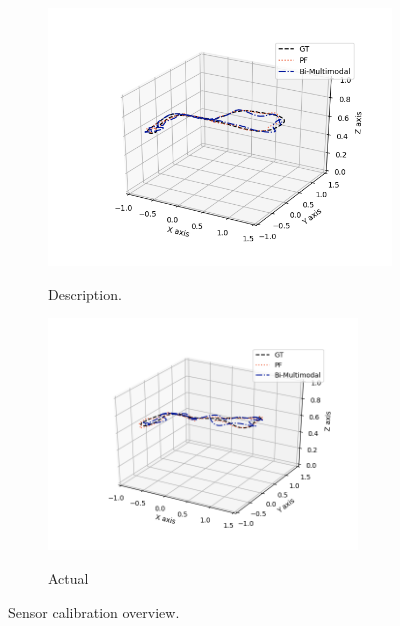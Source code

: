 \documentclass[letterpaper, 10 pt, conference]{ieeeconf}  %
\begin{document}
 \begin{figure}[h]
 	\centering
 	\begin{subfigure}[b]{.50\textwidth}
 		\centering
 		\includegraphics[width=.9\textwidth]{PF_multimodal_comparison1}
 		\label{fig:trajectory1} 	
 		\caption{Description.}
 	\end{subfigure}%
 	\begin{subfigure}[b]{.50\textwidth}
 		\centering
 		\includegraphics[width=0.9\textwidth]{PF_multimodal_comparison2}
 		\label{fig:trajectory2} 	
 		\caption{Actual}
 	\end{subfigure}
 	\caption{Sensor calibration overview.}
 	\label{fig:trajectory}
 \end{figure} 
 
\end{document}
